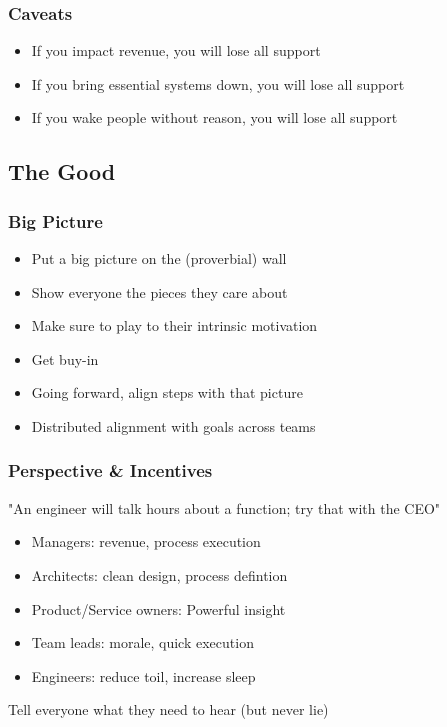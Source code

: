 \documentclass[t]{beamer}
\begin{document}
\begin{frame}
	\frametitle{Caveats}
	\vfill
	\begin{itemize}
		\item If you impact revenue, you will lose all support
		\item If you bring essential systems down, you will lose all support
		\item If you wake people without reason, you will lose all support
	\end{itemize}
	\vfill
\end{frame}

\subsection{The Good}


\begin{frame}
	\frametitle{Big Picture}
	\begin{itemize}
		\item Put a big picture on the (proverbial) wall
		\item Show everyone the pieces they care about
		\item Make sure to play to their intrinsic motivation
		\item Get buy-in
		\item Going forward, align steps with that picture
		\item Distributed alignment with goals across teams
	\end{itemize}
\end{frame}

\begin{frame}
	\frametitle{Perspective \& Incentives}
	"An engineer will talk hours about a function; try that with the CEO"
	\vfill
	\begin{itemize}
		\item Managers: revenue, process execution
		\item Architects: clean design, process defintion
		\item Product/Service owners: Powerful insight
		\item Team leads: morale, quick execution
		\item Engineers: reduce toil, increase sleep
	\end{itemize}
	\vfill
	Tell everyone what they need to hear (but never lie)
	\vfill
\end{frame}
\end{document}
